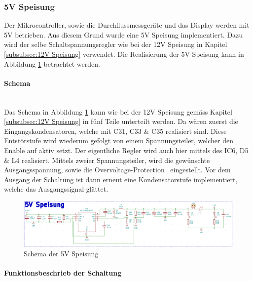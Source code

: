 \subsubsection{5V Speisung}
\label{subsubsec:5V Speisung}

Der Mikrocontroller, sowie die Durchflussmessgeräte und das Display  werden mit 5V betrieben. Aus diesem Grund wurde eine 5V Speisung implementiert. Dazu wird der selbe Schaltspannungsregler wie bei der 12V Speisung in Kapitel \ref{subsubsec:12V Speisung} verwendet. Die Realisierung der 5V Speisung kann in Abbildung \ref{fig:Schema_Speisung_5V} betrachtet werden.\\

\paragraph{Schema}\mbox{}\\

Das Schema in Abbildung \ref{fig:Schema_Speisung_5V} kann wie bei der 12V Speisung gemäss Kapitel \ref{subsubsec:12V Speisung} in fünf Teile unterteilt werden. Da wären zuerst die Eingangskondensatoren, welche mit C31, C33 \& C35 realisiert sind. Diese Entstörstufe wird wiederum gefolgt von einem Spannungsteiler, welcher den Enable auf aktiv setzt. Der eigentliche Regler wird auch hier mittels des IC6, D5 \& L4 realisiert. Mittels zweier Spannungsteiler, wird die gewünschte Ausgangsspannung, sowie die \flqq Overvoltage-Protection\frqq~ eingestellt. Vor dem Ausgang der Schaltung ist dann erneut eine Kondensatorstufe implementiert, welche das Ausgangssignal glättet.

\begin{figure}[h!]
	\centering
	\includegraphics[width=\textwidth]{graphics/Schema_Speisung_5V.png}
	\caption{Schema der 5V Speisung}
	\label{fig:Schema_Speisung_5V}
\end{figure} 

\paragraph{Funktionsbeschrieb der Schaltung}\mbox{}\\


